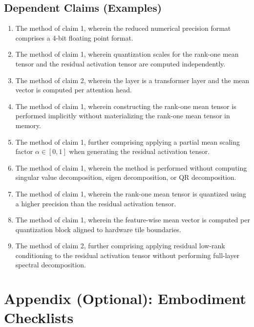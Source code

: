 \documentclass[11pt]{article}
\begin{document}
\subsection{Dependent Claims (Examples)}
\begin{enumerate}[leftmargin=1.3em, resume]
\item The method of claim 1, wherein the reduced numerical precision format comprises a 4-bit floating point format.
\item The method of claim 1, wherein quantization scales for the rank-one mean tensor and the residual activation tensor are computed independently.
\item The method of claim 2, wherein the layer is a transformer layer and the mean vector is computed per attention head.
\item The method of claim 1, wherein constructing the rank-one mean tensor is performed implicitly without materializing the rank-one mean tensor in memory.
\item The method of claim 1, further comprising applying a partial mean scaling factor $\alpha\in[0,1]$ when generating the residual activation tensor.
\item The method of claim 1, wherein the method is performed without computing singular value decomposition, eigen decomposition, or QR decomposition.
\item The method of claim 1, wherein the rank-one mean tensor is quantized using a higher precision than the residual activation tensor.
\item The method of claim 1, wherein the feature-wise mean vector is computed per quantization block aligned to hardware tile boundaries.
\item The method of claim 2, further comprising applying residual low-rank conditioning to the residual activation tensor without performing full-layer spectral decomposition.
\end{enumerate}

\section{Appendix (Optional): Embodiment Checklists}
\end{document}
